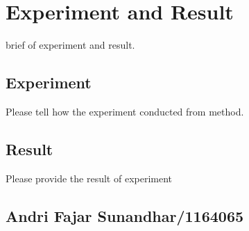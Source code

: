 \chapter{Experiment and Result}
brief of experiment and result.
\section{Experiment}
Please tell how the experiment conducted from method.

\section{Result}
Please provide the result of experiment

\section{Andri Fajar Sunandhar/1164065}

